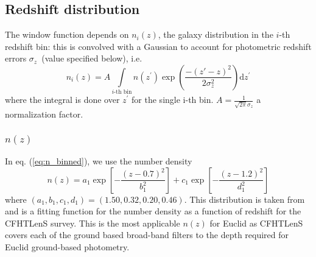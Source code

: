 \subsection{Redshift distribution}
\label{sec:WL_nofz}

The window function depends on $n_{i}(z)$, the galaxy distribution
in the $i$-th redshift bin: this is convolved with a Gaussian to account for photometric
redshift errors $\sigma_{z}$~(value specified below), i.e.~
\begin{equation}
n_{i}(z)=A \int\limits _{i\text{-th bin}}n({z^\prime})\exp\left(\frac{-(z\prime-z)^{2}}{2 \sigma_{z}^{2}}\right)\mathrm{d}{z^\prime}
\label{eq:n_binned}
\end{equation}
where the integral is done over $z^\prime$ for the single i-th bin. 
$A = \frac{1}{\sqrt{2\pi} \sigma_z}$ a normalization factor.

\subsubsection{$n(z)$}

In eq. (\ref{eq:n_binned}), we use the number density
%
\begin{equation}
n(z) = a_1\exp\left[-\frac{(z-0.7)^2}{b_1^2}\right]+c_1\exp\left[-\frac{(z-1.2)^2}{d_1^2}\right]
\label{eq:n_of_z_base}
\end{equation}
%
where $(a_1, b_1, c_1, d_1)=(1.50, 0.32, 0.20, 0.46)$. This distribution is taken from \cite{CFHTLenS-kappa-maps} and 
is a fitting function for the number density as a function of redshift for the CFHTLenS survey. This is the most applicable $n(z)$ for Euclid as 
CFHTLenS covers each of the ground based broad-band filters to the depth required for Euclid ground-based photometry. 


